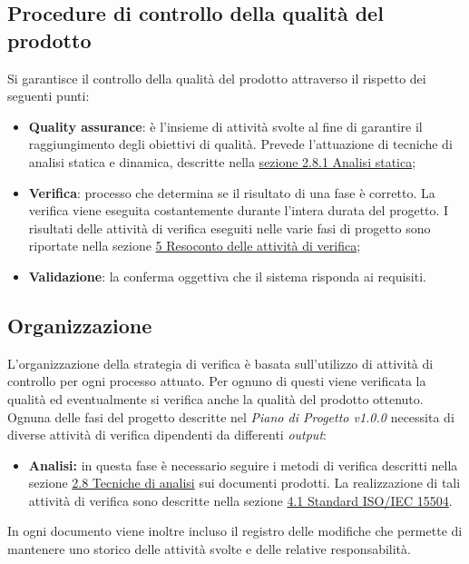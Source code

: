 \subsection{Procedure di controllo della qualità del prodotto}
Si garantisce il controllo della qualità del prodotto attraverso il rispetto dei seguenti punti:
\begin{itemize}
	\item \textbf{Quality assurance}: è l'insieme di attività svolte al 
	fine di garantire il raggiungimento degli obiettivi di qualità. Prevede 
	l'attuazione di tecniche di analisi statica e dinamica, descritte nella \hyperref[cap:sezione 2.8.1 Analisi statica]{sezione 2.8.1 Analisi statica};
	\item \textbf{Verifica}: processo che determina se il risultato di una fase 
	è corretto. La verifica viene eseguita costantemente durante 
	l'intera durata del progetto. I risultati delle attività di verifica 
	eseguiti nelle varie fasi di progetto sono riportate nella sezione \hyperref[cap:Sezione 5 Resoconto delle attività di verifica]{5 Resoconto delle attività di verifica};
	\item \textbf{Validazione}: la conferma oggettiva che il sistema risponda ai requisiti.
\end{itemize}

\subsection{Organizzazione}
L'organizzazione della strategia di verifica è basata sull'utilizzo di attività 
di controllo per ogni processo attuato. Per ognuno di questi viene verificata 
la qualità ed eventualmente si verifica anche la qualità del prodotto ottenuto.
Ognuna delle fasi del progetto descritte nel \textit{Piano di Progetto v1.0.0} necessita di diverse attività di verifica dipendenti da differenti \textit{output}:
\begin{itemize}
	\item \textbf{Analisi:} in questa fase è necessario seguire i metodi di 
	verifica descritti nella sezione \hyperref[cap:sezione 2.8 Tecniche di analisi]{2.8 Tecniche di analisi} sui 
	documenti prodotti. La realizzazione di tali attività di verifica sono 
	descritte nella sezione \hyperref[cap: sezione 4.1 Standard ISO/IEC 15504]{4.1 Standard ISO/IEC 15504}.
\end{itemize}
In ogni documento viene inoltre incluso il registro delle modifiche che permette di mantenere uno storico delle attività svolte e delle relative responsabilità.

